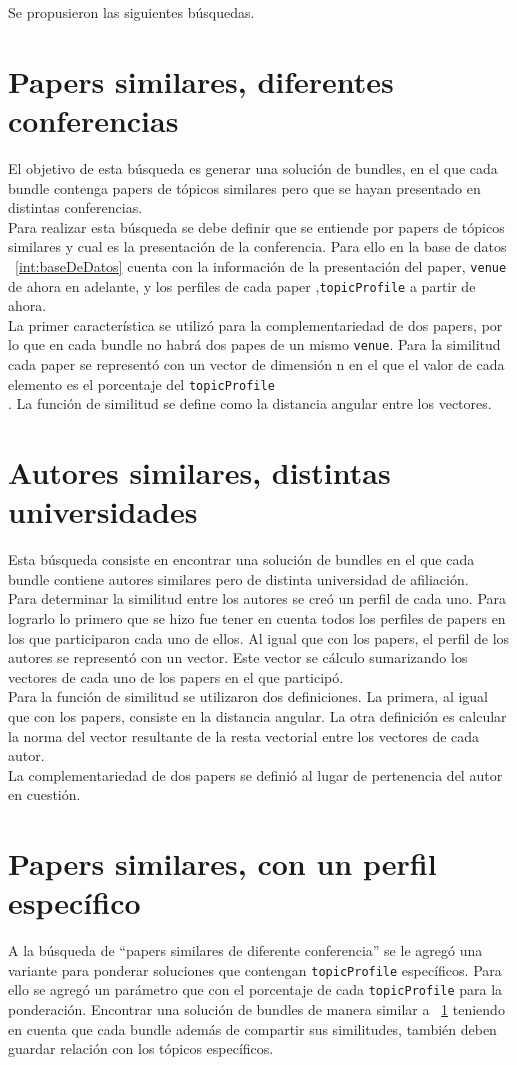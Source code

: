 Se propusieron las siguientes búsquedas.
\section{Papers similares, diferentes conferencias}\label{bus:papSimDisLug}
El objetivo de esta búsqueda es generar una solución de bundles, en el que cada bundle contenga 
papers de tópicos similares pero que se hayan presentado en distintas conferencias.\\
Para realizar esta búsqueda se debe definir que se entiende por papers de tópicos similares y cual 
es la presentación de la conferencia. Para ello en la base de datos ~\ref{int:baseDeDatos} cuenta 
con la información de la presentación del paper, \texttt{venue} de ahora en adelante, y los 
perfiles de cada paper ,\texttt{topicProfile} a partir de ahora.\\
La primer característica se utilizó para la complementariedad de dos papers, por lo que en cada 
bundle no habrá dos papes de un mismo \texttt{venue}. Para la similitud cada paper se representó
con un vector de dimensión n en el que el valor de cada elemento es el porcentaje del \texttt{topicProfile}\\.
La función de similitud se define como la distancia angular entre los vectores.
\section{Autores similares, distintas universidades}
Esta búsqueda consiste en encontrar una solución de bundles en el que cada bundle contiene autores 
similares pero de distinta universidad de afiliación.\\
Para determinar la similitud entre los autores se creó un perfil de cada uno. Para lograrlo lo 
primero que se hizo fue tener en cuenta todos los perfiles de papers en los que participaron cada 
uno de ellos. Al igual que con los papers, el perfil de los autores se representó con un vector. 
Este vector se cálculo sumarizando los vectores de cada uno de los papers en el que participó.\\
Para la función de similitud se utilizaron dos definiciones. La primera, al igual que con los papers,
consiste en la distancia angular. La otra definición es calcular la norma del vector resultante de la resta
vectorial entre los vectores de cada autor.\\
La complementariedad de dos papers se definió al lugar de pertenencia del autor en cuestión.
\section{Papers similares, con un perfil específico}
A la búsqueda de ``papers similares de diferente conferencia'' se le agregó una variante para ponderar
soluciones que contengan \texttt{topicProfile} específicos.
Para ello se agregó un parámetro que con el porcentaje de cada \texttt{topicProfile} para la ponderación.
Encontrar una solución de bundles de manera similar a ~\ref{bus:papSimDisLug} teniendo en cuenta que cada 
bundle además de compartir sus similitudes, también deben guardar relación con los tópicos 
específicos.\\

